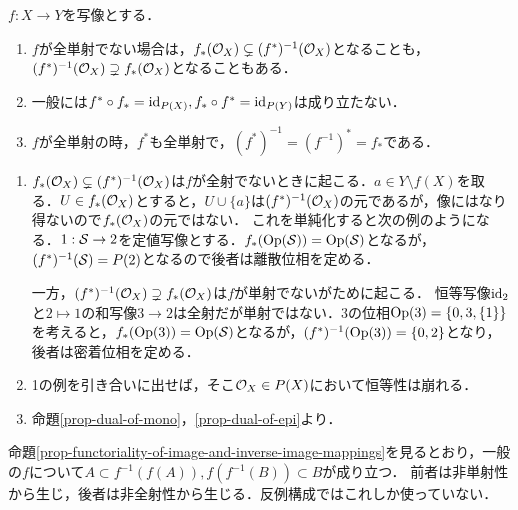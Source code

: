 \documentclass[uplatex,dvipdfmx]{jsreport}
\begin{document}
\begin{lemma}[押し出しが像位相になるとき]
    $f:X\to Y$を写像とする．
    \begin{enumerate}
        \item $f$が全単射でない場合は，$f_*(\O_X)\subsetneq (f^*)^{-1}(\O_X)$となることも，$(f^*)^{-1}(\O_X)\supsetneq f_*(\O_X)$となることもある．
        \item 一般には$f^*\circ f_*=\id_{P(X)},f_*\circ f^*=\id_{P(Y)}$は成り立たない．
        \item $f$が全単射の時，$f^*$も全単射で，$(f^*)^{-1}=(f^{-1})^*=f_*$である．
    \end{enumerate}
\end{lemma}
\begin{Proof}\mbox{}
    \begin{enumerate}
        \item $f_*(\O_X)\subsetneq (f^*)^{-1}(\O_X)$は$f$が全射でないときに起こる．$a\in Y\setminus f(X)$を取る．$U\in f_*(\O_X)$とすると，$U\cup\{a\}$は$(f^*)^{-1}(\O_X)$の元であるが，像にはなり得ないので$f_*(\O_X)$の元ではない．
        これを単純化すると次の例のようになる．$1:\S\to 2$を定値写像とする．$f_*(\Op(\S))=\Op(\S)$となるが，$(f^*)^{-1}(\S)=P(2)$となるので後者は離散位相を定める．

        一方，$(f^*)^{-1}(\O_X)\supsetneq f_*(\O_X)$は$f$が単射でないがために起こる．
        恒等写像$\id_2$と$2\mapsto 1$の和写像$3\to 2$は全射だが単射ではない．$3$の位相$\Op(3)=\{0,3,\{1\}\}$を考えると，$f_*(\Op(3))=\Op(\S)$となるが，$(f^*)^{-1}(\Op(3))=\{0,2\}$となり，後者は密着位相を定める．
        \item 1の例を引き合いに出せば，そこ$\O_X\in P(X)$において恒等性は崩れる．
        \item 命題\ref{prop-dual-of-mono}，\ref{prop-dual-of-epi}より．
    \end{enumerate}
\end{Proof}
\begin{remarks}
    命題\ref{prop-functoriality-of-image-and-inverse-image-mappings}を見るとおり，一般の$f$について$A\subset f^{-1}(f(A)),f(f^{-1}(B))\subset B$が成り立つ．
    前者は非単射性から生じ，後者は非全射性から生じる．反例構成ではこれしか使っていない．
\end{remarks}
\end{document}
